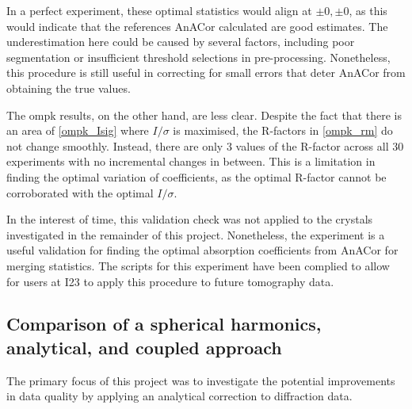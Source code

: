 In a perfect experiment, these optimal statistics would align at $\pm0,\pm0$, as this would indicate that the references AnACor calculated are good estimates. The underestimation here could be caused by several factors, including poor segmentation or insufficient threshold selections in pre-processing. Nonetheless, this procedure is still useful in correcting for small errors that deter AnACor from obtaining the true values. 

The ompk results, on the other hand, are less clear. Despite the fact that there is an area of \cref{ompk_Isig} where $I/\sigma$ is maximised, the R-factors in \cref{ompk_rm} do not change smoothly. Instead, there are only 3 values of the R-factor across all 30 experiments with no incremental changes in between. This is a limitation in finding the optimal variation of coefficients, as the optimal R-factor cannot be corroborated with the optimal $I/\sigma$.




In the interest of time, this validation check was not applied to the crystals investigated in the remainder of this project. Nonetheless, the experiment is a useful validation for finding the optimal absorption coefficients from AnACor for merging statistics. The scripts for this experiment have been complied to allow for users at I23 to apply this procedure to future tomography data. %


\subsection{Comparison of a spherical harmonics, analytical, and coupled approach} %
The primary focus of this project was to investigate the potential improvements in data quality by applying an analytical correction to diffraction data.



